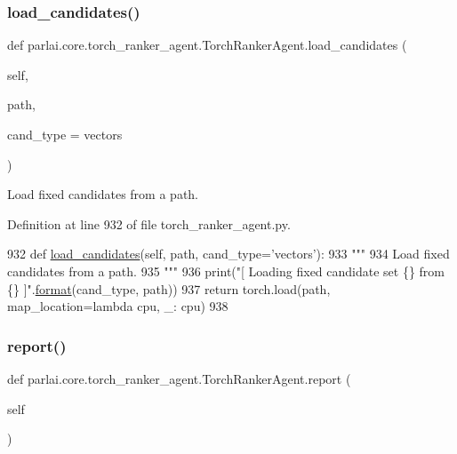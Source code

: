 \subsubsection{\texorpdfstring{load\+\_\+candidates()}{load\_candidates()}}
{\footnotesize\ttfamily def parlai.\+core.\+torch\+\_\+ranker\+\_\+agent.\+Torch\+Ranker\+Agent.\+load\+\_\+candidates (\begin{DoxyParamCaption}\item[{}]{self,  }\item[{}]{path,  }\item[{}]{cand\+\_\+type = {\ttfamily \textquotesingle{}vectors\textquotesingle{}} }\end{DoxyParamCaption})}

\begin{DoxyVerb}Load fixed candidates from a path.
\end{DoxyVerb}
 

Definition at line 932 of file torch\+\_\+ranker\+\_\+agent.\+py.


\begin{DoxyCode}
932     \textcolor{keyword}{def }\hyperlink{namespaceparlai_1_1tasks_1_1coco__caption_1_1agents_aa190162d0e36e1c93fc224b8a049f0cf}{load\_candidates}(self, path, cand\_type='vectors'):
933         \textcolor{stringliteral}{"""}
934 \textcolor{stringliteral}{        Load fixed candidates from a path.}
935 \textcolor{stringliteral}{        """}
936         print(\textcolor{stringliteral}{"[ Loading fixed candidate set \{\} from \{\} ]"}.\hyperlink{namespaceparlai_1_1chat__service_1_1services_1_1messenger_1_1shared__utils_a32e2e2022b824fbaf80c747160b52a76}{format}(cand\_type, path))
937         \textcolor{keywordflow}{return} torch.load(path, map\_location=\textcolor{keyword}{lambda} cpu, \_: cpu)
938 
\end{DoxyCode}
\mbox{\label{classparlai_1_1core_1_1torch__ranker__agent_1_1TorchRankerAgent_a6314748dfa9aaf6e26145af686d5787d}} 
\subsubsection{\texorpdfstring{report()}{report()}}
{\footnotesize\ttfamily def parlai.\+core.\+torch\+\_\+ranker\+\_\+agent.\+Torch\+Ranker\+Agent.\+report (\begin{DoxyParamCaption}\item[{}]{self }\end{DoxyParamCaption})}

